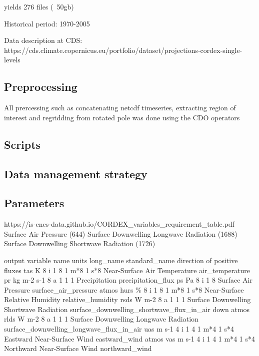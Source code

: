 \documentclass[hess, manuscript]{copernicus}
\begin{document}
yields 276 files (~50gb)

Historical period: 1970-2005

Data description at CDS:
https://cds.climate.copernicus.eu/portfolio/dataset/projections-cordex-single-levels

\subsection{Preprocessing}
All prercessing such as concatenating netcdf timeseries, extracting region of interest and regridding from rotated pole was done using the CDO operators
\subsection{Scripts}

\subsection{Data management strategy}

\subsection{Parameters}
https://is-enes-data.github.io/CORDEX_variables_requirement_table.pdf
Surface Air Pressure (644)
 Surface Downwelling Longwave Radiation (1688)
 Surface Downwelling Shortwave Radiation (1726)
 
 output variable name units  long_name standard_name direction of positive fluxes
 tas K 8 i 1 8 1 m*8 1 s*8 Near-Surface Air Temperature air_temperature 
 pr kg m-2 s-1 8 a 1 1 1 Precipitation precipitation_flux
 ps Pa 8 i 1 8 Surface Air Pressure surface_air_pressure atmos
 hurs \% 8 i 1 8 1 m*8 1 s*8 Near-Surface Relative Humidity relative_humidity
 rsds W m-2 8 a 1 1 1 Surface Downwelling Shortwave Radiation surface_downwelling_shortwave_flux_in_air down atmos
rlds W m-2 8 a 1 1 1 Surface Downwelling Longwave Radiation surface_downwelling_longwave_flux_in_air
uas m s-1 4 i 1 4 1 m*4 1 s*4 Eastward Near-Surface Wind eastward_wind atmos
vas m s-1 4 i 1 4 1 m*4 1 s*4 Northward Near-Surface Wind northward_wind

%
%
%
%
%
%
%
\end{document}
